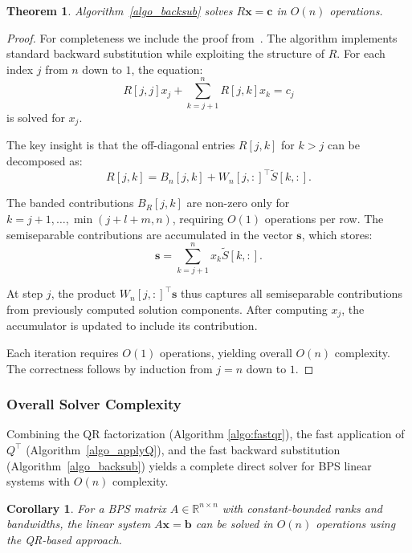 \documentclass[a4paper,fleqn]{cas-sc}
\newtheorem{mytheorem}{Theorem}
\newtheorem{corollary}{Corollary}
\begin{document}
\begin{mytheorem}
Algorithm~\ref{algo_backsub}  solves \( R\mathbf{x} = \mathbf{c} \) in \( O(n) \) operations.
\end{mytheorem}

\begin{proof}
For completeness we include the proof from~\cite{olver2013fast}. The algorithm implements standard backward substitution while exploiting the structure of \( R \). For each index \( j \) from \( n \) down to \( 1 \), the equation:
\[
R[j,j] x_j + \sum_{k=j+1}^n R[j,k] x_k = c_j
\]
is solved for \( x_j \).

The key insight is that the off-diagonal entries \( R[j,k] \) for \( k > j \) can be decomposed as:
\[
R[j,k] = B_n[j,k] + W_n[j,:]^\top \tilde S[k,:].
\]

The banded contributions \( B_R[j,k] \) are non-zero only for \( k = j+1, \ldots, \min(j+l+m, n) \), requiring \( O(1) \) operations per row. The semiseparable contributions are accumulated in the vector \( \mathbf{s} \), which stores:
\[
\mathbf{s} = \sum_{k=j+1}^n x_k \tilde S[k,:].
\]

At step \( j \), the product \( W_n[j,:] ^\top \mathbf{s} \) thus captures all semiseparable contributions from previously computed solution components. After computing \( x_j \), the accumulator is updated to include its contribution.

Each iteration requires \( O(1) \) operations, yielding overall \( O(n) \) complexity. The correctness follows by induction from \( j = n \) down to \( 1 \).
\end{proof}

\subsubsection{Overall Solver Complexity}

Combining the QR factorization (Algorithm \ref{algo:fastqr}), the fast application of \( Q^\top \) (Algorithm~\ref{algo_applyQ}), and the fast backward substitution (Algorithm~\ref{algo_backsub}) yields a complete direct solver for BPS linear systems with \( O(n) \) complexity.

\begin{corollary}
For a BPS matrix \( A \in \mathbb{R}^{n \times n} \) with constant-bounded ranks and bandwidths, the linear system \( A\mathbf{x} = \mathbf{b} \) can be solved in \( O(n) \) operations using the QR-based approach.
\end{corollary}
\end{document}
